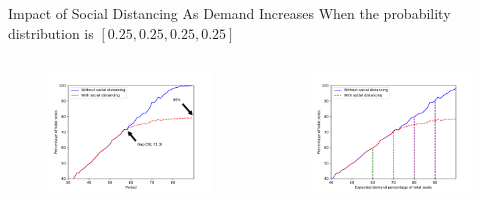     \begin{frame}{Impact of Social Distancing As Demand Increases}
      \vspace{-0.4cm}
      \scriptsize
      When the probability distribution is $[0.25, 0.25, 0.25, 0.25]$
      \begin{columns}
        \column{6cm}  %
          \begin{figure}[ht]
            \centering
            \includegraphics[width = 1\textwidth]{./images/without3.pdf}
          \end{figure}
          \column{6cm}
          \scriptsize
          \begin{figure}[ht]
            \centering
            \includegraphics[width = 1\textwidth]{./images/without5.pdf}

\end{figure}
\end{columns}
\end{frame}

